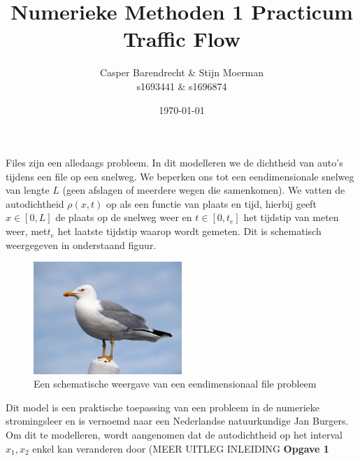 \documentclass{article}
\title{Numerieke Methoden 1 Practicum Traffic Flow}
\author{Casper Barendrecht \& Stijn Moerman\\ s1693441 \& s1696874}
\date{\today}
\begin{document}
\maketitle

Files zijn een alledaags probleem. In dit modelleren we de dichtheid van auto's tijdens een file op een snelweg. We beperken ons tot een eendimensionale snelweg van lengte \(L\) (geen afslagen of meerdere wegen die samenkomen). We vatten de autodichtheid \(\rho(x,t)\) op als een functie van plaats en tijd, hierbij geeft \(x\in[0,L]\) de plaats op de snelweg weer en \(t\in[0,t_e]\) het tijdstip van meten weer, met\(t_e\) het laatste tijdstip waarop wordt gemeten. Dit is schematisch weergegeven in onderstaand figuur.

\begin{figure}[H]
  \centering
  \includegraphics[width=0.5\textwidth]{seagull}
  \caption{Een schematische weergave van een eendimensionaal file probleem}
  \label{fig:bots}
\end{figure}
Dit model is een praktische toepassing van een probleem in de numerieke stromingsleer en is vernoemd naar een Nederlandse natuurkundige Jan Burgers.
Om dit te modelleren, wordt aangenomen dat de autodichtheid op het interval \(x_1,x_2\) enkel kan veranderen door  (MEER UITLEG INLEIDING
\textbf{Opgave 1}\\
\end{document}
